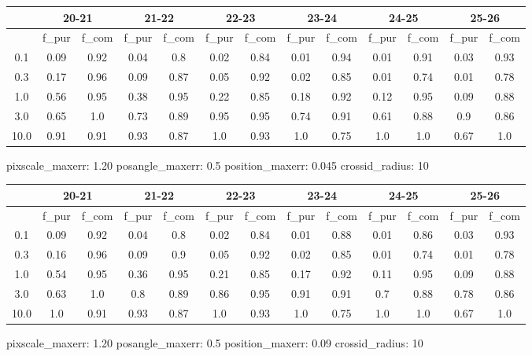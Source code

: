 \documentclass{article}
\begin{document}
\begin{figure}[H]
\centering
\begin{tabular}{|c|c|c|c|c|c|c|c|c|c|c|c|c|}
\hline
\multicolumn{1}{|c|}{} & \multicolumn{2}{|c|}{20-21} & \multicolumn{2}{|c|}{21-22} & \multicolumn{2}{|c|}{22-23} & \multicolumn{2}{|c|}{23-24} & \multicolumn{2}{|c|}{24-25} & \multicolumn{2}{|c|}{25-26}\\
\hline \hline
 & f\_pur & f\_com & f\_pur & f\_com & f\_pur & f\_com & f\_pur & f\_com & f\_pur & f\_com & f\_pur & f\_com \\
\hline
0.1 & 0.09 & 0.92 & 0.04 & 0.8 & 0.02 & 0.84 & 0.01 & 0.94 & 0.01 & 0.91 & 0.03 & 0.93\\
\hline
0.3 & 0.17 & 0.96 & 0.09 & 0.87 & 0.05 & 0.92 & 0.02 & 0.85 & 0.01 & 0.74 & 0.01 & 0.78\\
\hline
1.0 & 0.56 & 0.95 & 0.38 & 0.95 & 0.22 & 0.85 & 0.18 & 0.92 & 0.12 & 0.95 & 0.09 & 0.88\\
\hline
3.0 & 0.65 & 1.0 & 0.73 & 0.89 & 0.95 & 0.95 & 0.74 & 0.91 & 0.61 & 0.88 & 0.9 & 0.86\\
\hline
10.0 & 0.91 & 0.91 & 0.93 & 0.87 & 1.0 & 0.93 & 1.0 & 0.75 & 1.0 & 1.0 & 0.67 & 1.0\\
\hline
\end{tabular}
\caption{pixscale\_maxerr: 1.20 posangle\_maxerr: 0.5 position\_maxerr: 0.045 crossid\_radius: 10}
\end{figure}

\begin{figure}[H]
\centering
\begin{tabular}{|c|c|c|c|c|c|c|c|c|c|c|c|c|}
\hline
\multicolumn{1}{|c|}{} & \multicolumn{2}{|c|}{20-21} & \multicolumn{2}{|c|}{21-22} & \multicolumn{2}{|c|}{22-23} & \multicolumn{2}{|c|}{23-24} & \multicolumn{2}{|c|}{24-25} & \multicolumn{2}{|c|}{25-26}\\
\hline \hline
 & f\_pur & f\_com & f\_pur & f\_com & f\_pur & f\_com & f\_pur & f\_com & f\_pur & f\_com & f\_pur & f\_com \\
\hline
0.1 & 0.09 & 0.92 & 0.04 & 0.8 & 0.02 & 0.84 & 0.01 & 0.88 & 0.01 & 0.86 & 0.03 & 0.93\\
\hline
0.3 & 0.16 & 0.96 & 0.09 & 0.9 & 0.05 & 0.92 & 0.02 & 0.85 & 0.01 & 0.74 & 0.01 & 0.78\\
\hline
1.0 & 0.54 & 0.95 & 0.36 & 0.95 & 0.21 & 0.85 & 0.17 & 0.92 & 0.11 & 0.95 & 0.09 & 0.88\\
\hline
3.0 & 0.63 & 1.0 & 0.8 & 0.89 & 0.86 & 0.95 & 0.91 & 0.91 & 0.7 & 0.88 & 0.78 & 0.86\\
\hline
10.0 & 1.0 & 0.91 & 0.93 & 0.87 & 1.0 & 0.93 & 1.0 & 0.75 & 1.0 & 1.0 & 0.67 & 1.0\\
\hline
\end{tabular}
\caption{pixscale\_maxerr: 1.20 posangle\_maxerr: 0.5 position\_maxerr: 0.09 crossid\_radius: 10}
\end{figure}
\end{document}
